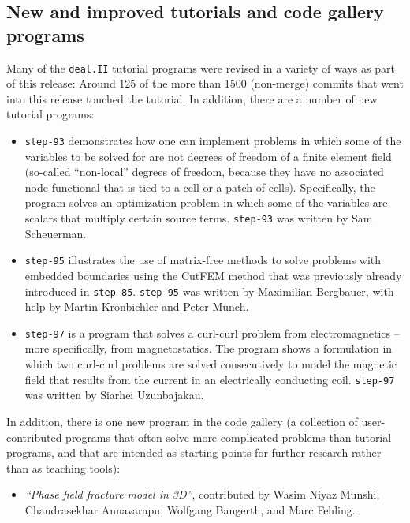 \documentclass{ansarticle-preprint}
\newcommand{\specialword}[1]{\texttt{#1}}
\newcommand{\dealii}{{\specialword{deal.II}}\xspace}
\newcommand{\step}[1]{{\specialword{step-#1}}\xspace}
\begin{document}
\subsection{New and improved tutorials and code gallery programs}
\label{subsec:steps}

Many of the \dealii tutorial programs were revised in a variety of ways
as part of this release: Around 125 of the more than 1500 (non-merge)
commits that went into this release touched the tutorial.
In addition, there are a number of new tutorial
programs:
\begin{itemize}
  \item
    \step{93}
    demonstrates how one can implement problems in which some of the
    variables to be solved for are not degrees of freedom of a finite
    element field (so-called ``non-local'' degrees of freedom, because
    they have no associated node functional that is tied to a cell or
    a patch of cells). Specifically, the program solves an
    optimization problem in which some of the variables are scalars
    that multiply certain source terms.
    \step{93} was written by Sam Scheuerman.
  \item
    \step{95} illustrates the use of matrix-free methods to solve
    problems with embedded boundaries using the CutFEM method that was
    previously already introduced in \step{85}. \step{95} was written
    by Maximilian Bergbauer, with help by Martin Kronbichler and Peter Munch.
  \item
    \step{97}
    is a program that solves a curl-curl problem from electromagnetics
    -- more specifically, from magnetostatics. The program shows a
    formulation in which two curl-curl problems are solved
    consecutively to model the magnetic field that results from the
    current in an electrically conducting coil.
    \step{97} was written by Siarhei Uzunbajakau.
\end{itemize}

In addition, there is one new program in the code gallery (a collection of
user-contributed programs that often solve more complicated problems
than tutorial programs, and that are intended as starting points for further
research rather than as teaching tools):
\begin{itemize}
  \item \emph{``Phase field fracture model in 3D''},
    contributed by Wasim Niyaz Munshi,
    Chandrasekhar Annavarapu,
    Wolfgang Bangerth, and
    Marc Fehling.
\end{itemize}
\end{document}
